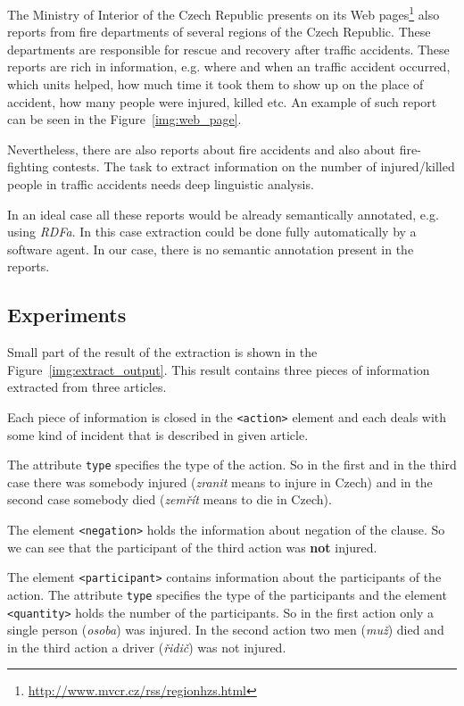 The Ministry of Interior of the Czech Republic presents on its Web pages\footnote{\url{http://www.mvcr.cz/rss/regionhzs.html}} also reports from fire departments of several regions of the Czech Republic. These departments are responsible for rescue and recovery after traffic accidents. These reports are rich in information, e.g. where and when an traffic accident occurred, which units helped, how much time it took them to show up on the place of accident, how many people were injured, killed etc. An example of such report can be seen in the Figure~\ref{img:web_page}.


Nevertheless, there are also reports about fire accidents and also about fire-fighting contests. The task to extract information on the number of injured/killed people in traffic accidents needs deep linguistic analysis.


In an ideal case all these reports would be already semantically annotated, e.g. using \emph{RDFa}. In this case extraction could be done fully automatically by a software agent. In our case, there is no semantic annotation present in the reports.


\subsection{Experiments}

Small part of the result of the extraction is shown in the Figure~\ref{img:extract_output}. This result contains three pieces of information extracted from three articles.

Each piece of information is closed in the \verb+<action>+ element and each deals with some kind of incident that is described in given article.

The attribute \verb+type+ specifies the type of the action. So in the first and in the third case there was somebody injured (\emph{zranit} means to injure in Czech) and in the second case somebody died (\emph{zemřít} means to die in Czech).

The element \verb+<negation>+ holds the information about negation of the clause. So we can see that the participant of the third action was \textbf{not} injured.

The element \verb+<participant>+ contains information about the participants of the action. The attribute \verb+type+ specifies the type of the participants and the element \verb+<quantity>+ holds the number of the participants. So in the first action only a single person (\emph{osoba}) was injured. In the second action two men (\emph{muž}) died and in the third action a driver (\emph{řidič}) was not injured.




